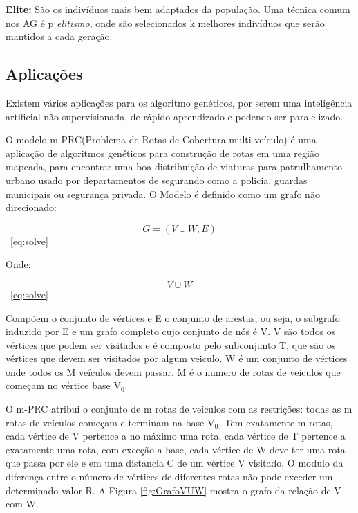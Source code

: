 \textbf{Elite:} São os indivíduos mais bem adaptados da população. Uma técnica comum nos AG é p \textit{elitismo}, onde são selecionados k melhores indivíduos que serão mantidos a cada geração.

\subsection{Aplicações}
Existem vários aplicações para os algoritmo genéticos, por serem uma inteligência artificial não supervisionada, de rápido aprendizado e podendo ser paralelizado.

O modelo m-PRC(Problema de Rotas de Cobertura multi-veículo) é uma aplicação de algoritmos genéticos para construção de rotas em uma região mapeada, para encontrar uma boa distribuição de viaturas para patrulhamento urbano usado por departamentos de segurando como a policia, guardas municipais ou segurança privada. 
O Modelo é definido como um grafo não direcionado: 

\begin{equation} \label{eq:solve}
G=(V\cup W, E)
\end{equation}
\cite{Washington}~\ref{eq:solve}

Onde: 

\begin{equation} \label{eq:solve}
V\cup W
\end{equation}
\cite{Washington}~\ref{eq:solve}

Compõem o conjunto de vértices e E o conjunto de arestas, ou seja, o subgrafo induzido por E e um grafo completo cujo conjunto de nós é V. 
V são todos os vértices que podem ser visitados e é composto pelo subconjunto T, que são os vértices que devem ser visitados por algum veiculo. W é um conjunto de vértices onde todos os M veículos devem passar. M é o numero de rotas de veículos que começam no vértice base V$_0$. 

O m-PRC atribui o conjunto de m rotas de veículos com as restrições: todas as m rotas de veículos começam e terminam na base V$_0$, Tem exatamente m rotas, cada vértice de V pertence a no máximo uma rota, cada vértice de T pertence a exatamente uma rota, com exceção a base, cada vértice de W deve ter uma rota que passa por ele e em uma distancia C de um vértice V visitado, O modulo da diferença entre o número de vértices de diferentes rotas não pode exceder um determinado valor R. A Figura \ref{fig:GrafoVUW} mostra o grafo da relação de V com W.

